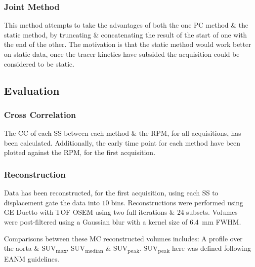         \subsubsection{Joint Method} \label{sec:joint_method}
            This method attempts to take the advantages of both the one \gls{PC} method \& the static method, by truncating \& concatenating the result of the start of one with the end of the other. The motivation is that the static method would work better on static data, once the tracer kinetics have subsided the acquisition could be considered to be static.
            
    \vspace{-0.5cm}
    
    \subsection{Evaluation} \label{sec:evaluation}
        \subsubsection{Cross Correlation} \label{sec:cross_correlation}
            The \gls{CC} of each \gls{SS} between each method \& the \gls{RPM}, for all acquisitions, has been calculated. Additionally, the early time point  for each method have been plotted against the \gls{RPM}, for the first acquisition.
        
        \subsubsection{Reconstruction} \label{sec:reconstruction}
            Data has been reconstructed, for the first acquisition, using each \gls{SS} to displacement gate the data into $10$ bins. Reconstructions were performed using \gls{GE} Duetto with \gls{TOF} \gls{OSEM} using two full iterations \& $24$ subsets.%
            Volumes were post-filtered using a Gaussian blur with a kernel size of \SI{6.4}{\milli\metre} \gls{FWHM}.
            
            Comparisons between these \gls{MC} reconstructed volumes includes: A profile over the aorta \& \gls{SUV}\textsubscript{max}, \gls{SUV}\textsubscript{median} \& \gls{SUV}\textsubscript{peak}. \gls{SUV}\textsubscript{peak} here was defined following \gls{EANM} guidelines.%
            
\vspace{-0.5cm}
        

